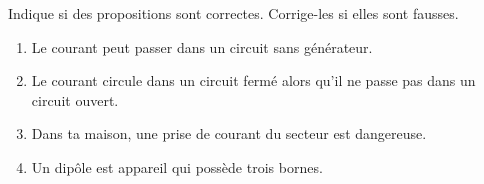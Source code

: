 Indique si des propositions sont correctes. Corrige-les si elles sont fausses.
\begin{enumerate}
    \item Le courant peut passer dans un circuit sans générateur.
    \item Le courant circule dans un circuit fermé alors qu'il ne passe pas dans
          un circuit ouvert.
    \item Dans ta maison, une prise de courant du secteur est dangereuse.
    \item Un dipôle est appareil qui possède trois bornes.
\end{enumerate}

